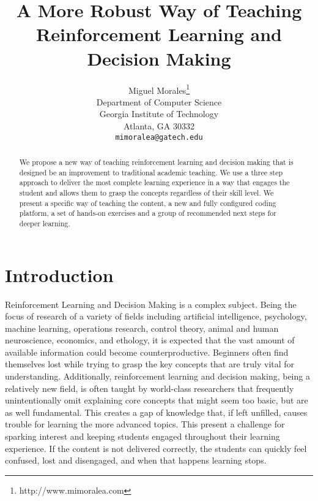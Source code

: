 \documentclass[11pt]{article} %
\title{A More Robust Way of Teaching Reinforcement Learning and Decision Making}
\author{
Miguel Morales\thanks{http://www.mimoralea.com} \\
Department of Computer Science \\
Georgia Institute of Technology \\
Atlanta, GA 30332 \\
\texttt{mimoralea@gatech.edu} \\
}
\begin{document}
\maketitle

\begin{abstract}
  We propose a new way of teaching reinforcement learning and decision making
  that is designed be an improvement to traditional academic teaching. We use
  a three step approach to deliver the most complete learning experience in a
  way that engages the student and allows them to grasp the concepts regardless
  of their skill level. We present a specific way of teaching the content, a
  new and fully configured coding platform, a set of hands-on exercises and
  a group of recommended next steps for deeper learning.
\end{abstract}



\startmain %

\section{Introduction}
Reinforcement Learning and Decision Making is a complex subject. Being the
focus of research of a variety of fields including artificial intelligence,
psychology, machine learning, operations research, control theory, animal
and human neuroscience, economics, and ethology, it is expected that the
vast amount of available information could become counterproductive.
Beginners often find themselves lost while trying to grasp the key concepts
that are truly vital for understanding. Additionally, reinforcement learning
and decision making, being a relatively new field, is often taught by
world-class researchers that frequently unintentionally omit explaining
core concepts that might seem too basic, but are as well fundamental. This
creates a gap of knowledge that, if left unfilled, causes trouble for learning
the more advanced topics. This present a challenge for sparking interest and
keeping students engaged throughout their learning experience. If the content
is not delivered correctly, the students can quickly feel confused, lost and
disengaged, and when that happens learning stops.
\end{document}
